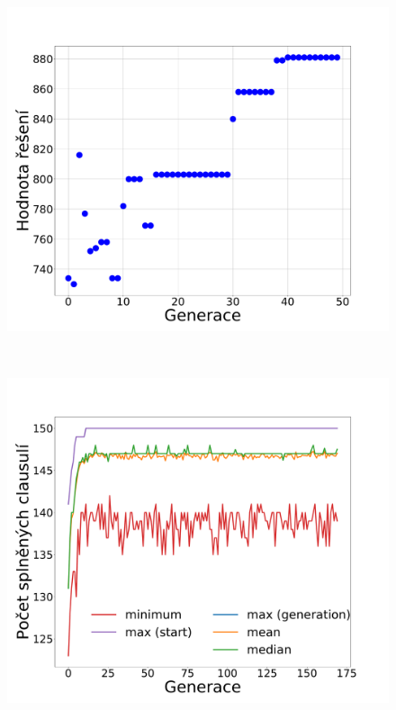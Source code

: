 \documentclass[11pt]{article}
\begin{document}
\begin{figure}
\begin{minipage}[c]{0.325\textwidth}
        \centering \includegraphics[width=\textwidth]{img/gc2w.pdf} 
    \end{minipage}
    \\
    \begin{minipage}[c]{0.325\textwidth}
        \centering\includegraphics[width=\textwidth]{img/gc3p.pdf} 
    \end{minipage}
    \begin{minipage}[c]{0.325\textwidth}

\end{minipage}
\end{figure}
\end{document}
